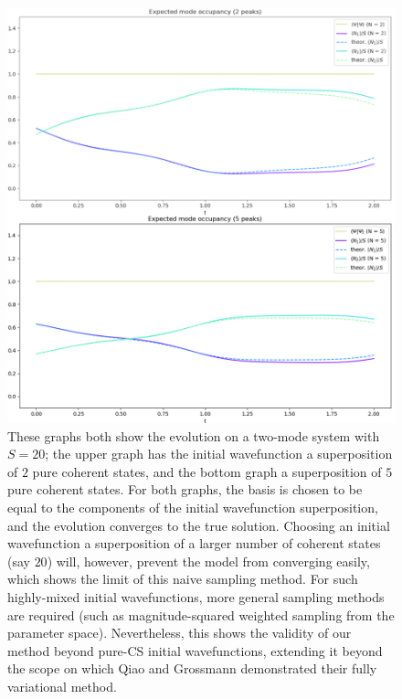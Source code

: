 \begin{figure} \label{fig:multiple_peaks_benchmark}
\begin{center}
\includegraphics[width=\textwidth]{images/multiple_peaks_benchmark}
\caption{These graphs both show the evolution on a two-mode system with $S=20$; the upper graph has the initial wavefunction a superposition of $2$ pure coherent states, and the bottom graph a superposition of $5$ pure coherent states. For both graphs, the basis is chosen to be equal to the components of the initial wavefunction superposition, and the evolution converges to the true solution. Choosing an initial wavefunction a superposition of a larger number of coherent states (say $20$) will, however, prevent the model from converging easily, which shows the limit of this naive sampling method. For such highly-mixed initial wavefunctions, more general sampling methods are required (such as magnitude-squared weighted sampling from the parameter space). Nevertheless, this shows the validity of our method beyond pure-CS initial wavefunctions, extending it beyond the scope on which Qiao and Grossmann demonstrated their fully variational method.}
\end{center}
\end{figure}